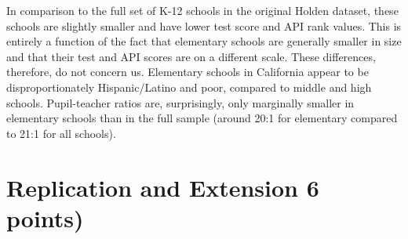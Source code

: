 \documentclass[a4paper, 11pt]{article}
\begin{document}
\begin{enumerate}
	In comparison to the full set of K-12 schools in the original Holden dataset, these schools are slightly smaller and have lower test score and API rank values. This is entirely a function of the fact that elementary schools are generally smaller in size and that their test and API scores are on a different scale. These differences, therefore, do not concern us. Elementary schools in California appear to be disproportionately Hispanic/Latino and poor, compared to middle and high schools. Pupil-teacher ratios are, surprisingly, only marginally smaller in elementary schools than in the full sample (around 20:1 for elementary compared to 21:1 for all schools).



\end{enumerate}



\section{Replication and Extension 6 points)}
\end{document}
